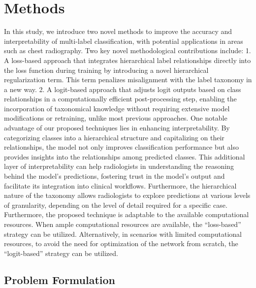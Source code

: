\documentclass[review,1p,times,numbers]{elsarticle}
\begin{document}
\section{Methods}\label{sec:taxonomy.methods}
In this study, we introduce two novel methods to improve the accuracy and interpretability of multi-label classification, with potential applications in areas such as chest radiography.
Two key novel methodological contributions include:
1.	A loss-based approach that integrates hierarchical label relationships directly into the loss function during training by introducing a novel hierarchical regularization term. This term penalizes misalignment with the label taxonomy in a new way.
2.	A logit-based approach that adjusts logit outputs based on class relationships in a computationally efficient post-processing step, enabling the incorporation of taxonomical knowledge without requiring extensive model modifications or retraining, unlike most previous approaches.
One notable advantage of our proposed techniques lies in enhancing interpretability. By categorizing classes into a hierarchical structure and capitalizing on their relationships, the model not only improves classification performance but also provides insights into the relationships among predicted classes.  This additional layer of interpretability can help radiologists in understanding the reasoning behind the model's predictions, fostering trust in the model's output and facilitate its integration into clinical workflows. Furthermore, the hierarchical nature of the taxonomy allows radiologists to explore predictions at various levels of granularity, depending on the level of detail required for a specific case. Furthermore, the proposed technique is adaptable to the available computational resources. When ample computational resources are available, the ``loss-based'' strategy can be utilized. Alternatively, in scenarios with limited computational resources, to avoid the need for optimization of the network from scratch, the ``logit-based'' strategy can be utilized.

\subsection{Problem Formulation}\label{subsec:taxonomy.problem_formulation}
\end{document}
